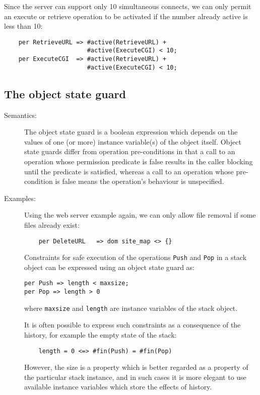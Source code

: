 \documentclass{overturerepchap}
\begin{document}
{\begin{description}
Since the server can support only 10 simultaneous connects, we can
only permit an execute or retrieve operation to be activated if the
number already active is less than 10:
\begin{lstlisting}
    per RetrieveURL => #active(RetrieveURL) +
                       #active(ExecuteCGI) < 10;
    per ExecuteCGI  => #active(RetrieveURL) +
                       #active(ExecuteCGI) < 10;
\end{lstlisting}
\end{description}

\subsection{The object state guard}
\begin{description}
\item[Semantics:]
The object state guard is a boolean expression which depends on the values of
one (or more) instance variable(s) of the object itself. Object state
guards differ from operation pre-conditions in that a call to an
operation whose permission predicate is false results in the caller
blocking until the predicate is satisfied, whereas a call to an
operation whose pre-condition is false means the operation's behaviour
is unspecified.

\item[Examples:]
Using the web server example again, we can only allow file removal if
some files already exist:
\begin{lstlisting}
    per DeleteURL   => dom site_map <> {}
\end{lstlisting}

Constraints for safe execution of the operations {\tt Push} and {\tt Pop}
in a stack object can be expressed using an object state guard as:
\begin{lstlisting}
per Push => length < maxsize;
per Pop => length > 0
\end{lstlisting}
where {\tt maxsize} and {\tt length} are instance variables of
the stack object.

It is often possible to express such constraints as a
consequence of the history,
for example the empty state of the stack:
\begin{lstlisting}
    length = 0 <=> #fin(Push) = #fin(Pop)
\end{lstlisting}
However, the size is a property which is better regarded as a
property of the particular stack instance, and in such cases it is
more elegant to use available instance variables which store the effects
of history.


\end{description}}
\end{document}
